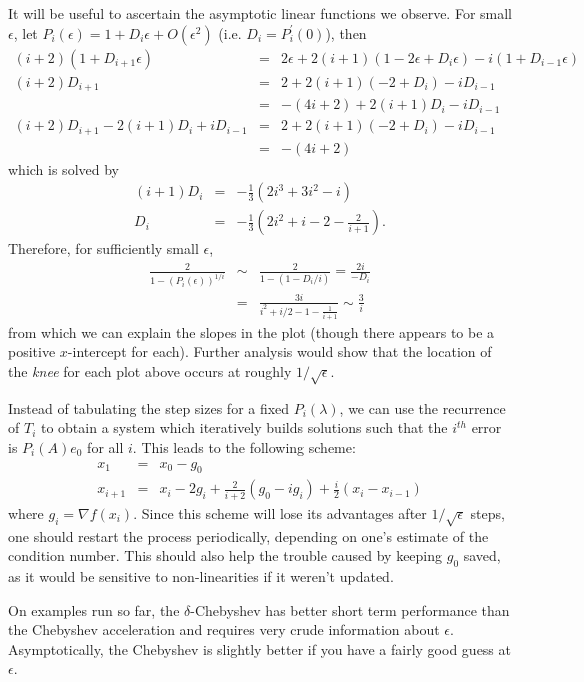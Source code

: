 \documentclass{article}
\newcommand{\beas}{\begin{eqnarray*}}
\newcommand{\enas}{\end{eqnarray*}}
\begin{document}
It will be useful to ascertain the asymptotic linear functions we
observe.  For small $\epsilon$, let
$P_i(\epsilon) = 1+D_i \epsilon + O(\epsilon^2)$
(i.e. $D_i = P^\prime_i(0)$), then
\beas
(i+2)(1 + D_{i+1} \epsilon)
&=&
2 \epsilon +
2(i+1) (1-2\epsilon + D_{i} \epsilon)
- i (1+D_{i-1} \epsilon)\\
(i+2) D_{i+1}
&=&
2+2 (i+1) (-2 + D_{i})-i D_{i-1}\\
&=&
-(4i+2)
+2(i+1) D_{i}
-i D_{i-1}\\
(i+2) D_{i+1}
-2(i+1) D_{i}
+i D_{i-1}
&=&
2+2 (i+1) (-2 + D_{i})-i D_{i-1}\\
&=&
-(4i+2)
\enas
which is solved by
\beas
(i+1) D_i &=& -\frac{1}{3}( 2 i^3 + 3 i^2 - i )\\
 D_i &=& -\frac{1}{3}( 2 i^2 + i - 2 - \frac{2}{i+1}).
\enas
Therefore, for sufficiently small $\epsilon$,
\beas
\frac{2}{1 - (P_i(\epsilon))^{1/i}}
&\sim&
\frac{2}{1-(1-D_i/i)} = \frac{2i}{-D_i}\\
&=&
\frac{3i}{i^2 + i/2 - 1 - \frac{1}{i+1} }
\sim \frac{3}{i}
\enas
from which we can explain the slopes in the plot (though there appears
to be a positive $x$-intercept for each).
Further analysis would show that
the location of the {\em knee} for each plot above occurs at
roughly $1/\sqrt{\epsilon}$.

Instead of tabulating the step sizes for a fixed $P_i(\lambda)$, we can
use the recurrence of $T_i$ to obtain a system which iteratively
builds solutions such that the $i^{th}$ error is $P_i(A) e_0$ for all
$i$.  This leads to the following scheme:
\beas
x_1 &=& x_0 - g_0\\
x_{i+1}
 &=& x_i - 2 g_i + \frac{2}{i+2}(g_0 - i g_i) + \frac{i}{2}(x_i - x_{i-1})
\enas
where $g_i = \nabla f(x_i)$.  Since this scheme will lose its
advantages after $1/\sqrt{\epsilon}$ steps, one should restart the
process periodically, depending on one's estimate of the condition number.
This should also help the trouble caused by keeping $g_0$ saved,
as it would be sensitive to non-linearities if it weren't updated.

On examples run so far, the $\delta$-Chebyshev has better short term
performance than the Chebyshev acceleration and requires very crude
information about $\epsilon$.  Asymptotically, the
Chebyshev is slightly better if you have a fairly good guess at
$\epsilon$.
\end{document}

